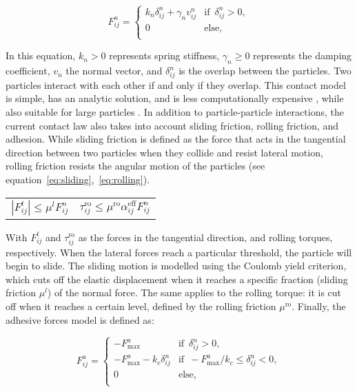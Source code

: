 \begin{equation}
 F_{ij}^n=\begin{cases}
 k_n \delta_{ij}^n + \gamma_n v_{ij}^n &\text{if } \, \delta_{ij}^n > 0, \\
 0 \quad &\text{else, } \, \\
 \end{cases}
\end{equation}

In this equation, $k_n > 0$ represents spring stiffness, $\gamma_n \geq 0$ represents the damping coefficient, $v_n$ the normal vector, and $\delta_{ij}^n$ is the overlap between the particles. Two particles interact with each other if and only if they overlap. This contact model is simple, has an analytic solution, and is less computationally expensive \cite{NAVARRO2013}, while also suitable for large particles \cite{MercuryDPM}. In addition to particle-particle interactions, the current contact law also takes into account sliding friction, rolling friction, and adhesion. While sliding friction is defined as the force that acts in the tangential direction between two particles when they collide and resist lateral motion, rolling friction resists the angular motion of the particles (see equation~\ref{eq:sliding},~\ref{eq:rolling}).


\noindent
\begin{tabularx}{\linewidth}{@{}XX@{}}
 \begin{equation} \label{eq:sliding}
 |F_{ij}^t| \leq \mu^lF_{ij}^n
 \end{equation}
 &
 \begin{equation}\label{eq:rolling}
 \tau_{ij}^{\text{ro}} \leq \mu^{\text{ro}} \alpha^{\text{eff}}_{ij} F_{ij}^n
 \end{equation}
\end{tabularx}

With $F_{ij}^t$ and $\tau_{ij}^{\text{ro}}$ as the forces in the tangential direction, and rolling torques, respectively. When the lateral forces reach a particular threshold, the particle will begin to slide. The sliding motion is modelled using the Coulomb yield criterion, which cuts off the elastic displacement when it reaches a specific fraction (sliding friction $\mu^l$) of the normal force. The same applies to the rolling torque: it is cut off when it reaches a certain level, defined by the rolling friction $\mu^{\text{ro}}$. Finally, the adhesive forces model is defined as: 

\begin{equation}
 F_{ij}^a=\begin{cases}
 -F^a_{\text{max}} &\text{if } \, \delta_{ij}^n > 0, \\
 -F^a_{\text{max}} - k_c \delta_{ij}^n &\text{if } \, -F^a_{\text{max}} / k_c \leq \delta_{ij}^n < 0, \\
 0 \quad &\text{else, } \, \\
 \end{cases}
\end{equation}

